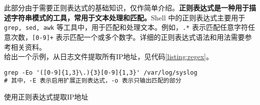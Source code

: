 此部分由于需要正则表达式的基础知识，仅作简单介绍。\textbf{正则表达式是一种用于描述字符串模式的工具，常用于文本处理和匹配。}Shell 中的正则表达式主要用于 \texttt{grep, sed, awk} 等工具中，用于匹配和处理文本。例如，\texttt{.*} 表示匹配任意字符任意次数，\texttt{[0-9]+} 表示匹配一个或多个数字。详细的正则表达式语法和用法需要参考相关资料。\\

给出一个示例，从日志文件提取所有IP地址，见代码\ref{listing:regex}。

\begin{longlisting}
    \begin{verbatim}
grep -Eo '([0-9]{1,3}\.){3}[0-9]{1,3}' /var/log/syslog
# 其中，-E 表示启用扩展正则表达式，-o 表示只输出匹配的部分
    \end{verbatim}
    \caption{使用正则表达式提取IP地址}
    \label{listing:regex}
\end{longlisting}